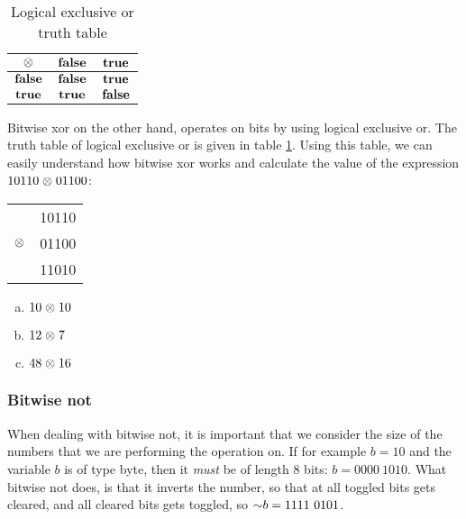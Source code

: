 \begin{table}
  \centering
  \begin{tabular}{|c|c|c|}
    \hline
    $\mathbf{\mathrel{\otimes}}$ & $\mathbf{\textbf{false}}$ & $\mathbf{\textbf{true}}$ \\ \hline
    $\mathbf{\textbf{false}}$ & $\mathbf{\textbf{false}}$ & $\mathbf{\textbf{true}}$ \\ \hline
    $\mathbf{\textbf{true}}$ & $\mathbf{\textbf{true}}$ & $\mathbf{\textbf{false}}$ \\ \hline
  \end{tabular}
  \caption{Logical exclusive or truth table}
  \label{tab:log-exlusive-or-table}
\end{table}

Bitwise xor on the other hand, operates on bits by using logical
exclusive or. The truth table of logical exclusive or is given in
table \ref{tab:log-exlusive-or-table}. Using this table, we can easily
understand how bitwise xor works and calculate the value of the
expression $10110 \mathrel{\otimes} 01100$:

\begin{center}
  \begin{tabular}{lr}
    & 10110  \\
    $\mathrel{\otimes}$ & 01100 \\
    \hline
    & 11010 \\
  \end{tabular}
\end{center}

\begin{Exercise}[label={bitxor}]
  \begin{enumerate}[(a)]
  \item $10 \mathrel{\otimes} 10$
  \item $12 \mathrel{\otimes} 7$
  \item $48 \mathrel{\otimes} 16$
  \end{enumerate}
\end{Exercise}

\subsubsection{Bitwise not}

When dealing with bitwise not, it is important that we consider the
size of the numbers that we are performing the operation on. If for
example $b=10$ and the variable $b$ is of type byte, then it
\textit{must} be of length 8 bits: $b=0000\ 1010$. What bitwise not
does, is that it inverts the number, so that at all toggled bits gets
cleared, and all cleared bits gets toggled, so $\mathord{\sim} b = 1111\
0101$.

